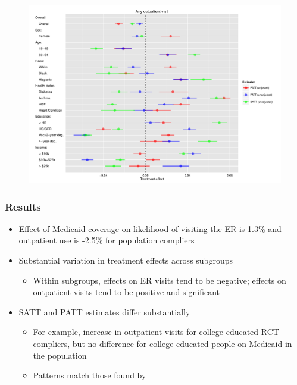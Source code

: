 \documentclass{beamer}
\begin{document}
\begin{frame}
\begin{figure}[htbp]
\begin{center}
   \includegraphics[scale=0.4]{../paper/any-out-plot-horz.pdf} 
   \label{het-plot-ao}
   \end{center}
\end{figure}
\end{frame}

\begin{frame}
\frametitle{Results}
\begin{itemize}
\item Effect of Medicaid coverage on likelihood of visiting the ER is 1.3\% and outpatient use is -2.5\% for population compliers
\item Substantial variation in treatment effects across subgroups
\begin{itemize}
\item Within subgroups, effects on ER visits tend to be negative; effects on outpatient visits tend to be positive and significant
\end{itemize}
\item SATT and PATT estimates differ substantially
\begin{itemize}
\item For example, increase in outpatient visits for college-educated RCT compliers, but no difference for college-educated people on Medicaid in the population
\item Patterns match those found by  \citep{finkelstein2012}
\end{itemize}
\end{itemize}
\end{frame}
\end{document}
